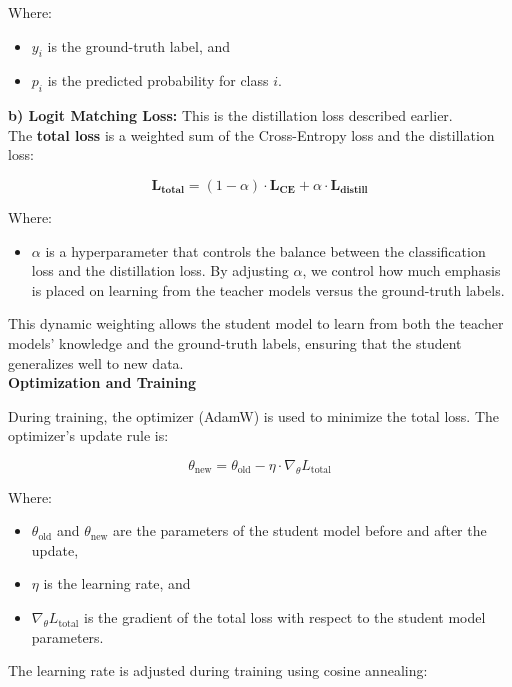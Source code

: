 \documentclass{article}
\begin{document}
Where:
\begin{itemize}[noitemsep, topsep=0pt]
    \item \( y_i \) is the ground-truth label, and
    \item \( p_i \) is the predicted probability for class \( i \).\\
\end{itemize}


\textbf{b) Logit Matching Loss:} This is the distillation loss described earlier. \\

The \textbf{total loss} is a weighted sum of the Cross-Entropy loss and the distillation loss:

\[
\boldsymbol{L_{\text{total}}} = (1 - \alpha) \cdot \boldsymbol{L_{\text{CE}}} + \alpha \cdot \boldsymbol{L_{\text{distill}}}
\]


Where:
\begin{itemize}
    \item \( \alpha \) is a hyperparameter that controls the balance between the classification loss and the distillation loss. By adjusting \( \alpha \), we control how much emphasis is placed on learning from the teacher models versus the ground-truth labels.
\end{itemize}

This dynamic weighting allows the student model to learn from both the teacher models' knowledge and the ground-truth labels, ensuring that the student generalizes well to new data.\\

\textbf{Optimization and Training}

During training, the optimizer (AdamW) is used to minimize the total loss. The optimizer's update rule is:

\[
\theta_{\text{new}} = \theta_{\text{old}} - \eta \cdot \nabla_\theta L_{\text{total}}
\]

Where:
\begin{itemize}[itemsep=0.5pt, topsep=1pt]
    \item \( \theta_{\text{old}} \) and \( \theta_{\text{new}} \) are the parameters of the student model before and after the update,
    \item \( \eta \) is the learning rate, and
    \item \( \nabla_\theta L_{\text{total}} \) is the gradient of the total loss with respect to the student model parameters.
\end{itemize}

The learning rate is adjusted during training using cosine annealing:
\end{document}
